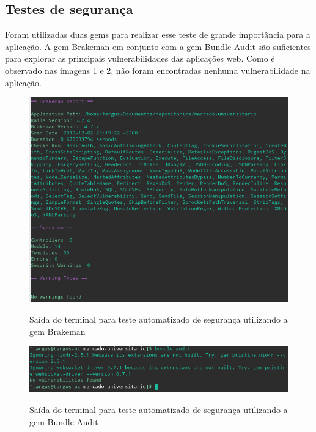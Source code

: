 \subsection{Testes de segurança}
Foram utilizadas duas gems para realizar esse teste de grande importância para a aplicação. A gem Brakeman em conjunto com a gem Bundle Audit são suficientes para explorar as principais vulnerabilidades das aplicações web. Como é observado nas imagens \ref{fig:brakeman} e \ref{fig:audit}, não foram encontradas nenhuma vulnerabilidade na aplicação.
\begin{figure}[htbp!]
  \centering
  \caption{Saída do terminal para teste automatizado de segurança utilizando a gem Brakeman}
  \includegraphics[width=1\textwidth]{figs/brakeman.png}
    \label{fig:brakeman}
\end{figure}
\begin{figure}[htbp!]
  \centering
  \caption{Saída do terminal para teste automatizado de segurança utilizando a gem Bundle Audit}
  \includegraphics[width=1\textwidth]{figs/bundle_audit.png}
    \label{fig:audit}
\end{figure}
